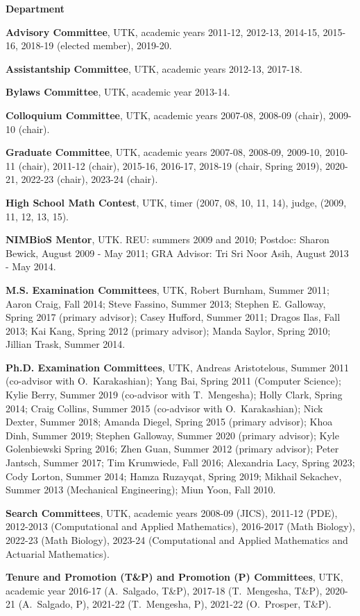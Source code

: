 \documentclass[11pt]{letter}
\begin{document}
\begin{description}
	\item
{\Large\bf Department}
    \begin{description}
    \item
\textbf{Advisory Committee}, UTK, academic years 2011-12, 2012-13, 2014-15, 2015-16, 2018-19 (elected member), 2019-20.
    \item
\textbf{Assistantship Committee}, UTK, academic years 2012-13, 2017-18.
    \item
\textbf{Bylaws Committee}, UTK, academic year 2013-14.
	\item
\textbf{Colloquium Committee}, UTK, academic years 2007-08, 2008-09 (chair), 2009-10 (chair).
    \item
\textbf{Graduate Committee}, UTK, academic years 2007-08, 2008-09, 2009-10, 2010-11 (chair), 2011-12 (chair), 2015-16, 2016-17, 2018-19 (chair, Spring 2019), 2020-21, 2022-23 (chair), 2023-24 (chair).
    \item
\textbf{High School Math Contest}, UTK, timer (2007, 08, 10, 11, 14), judge, (2009, 11, 12, 13, 15).
    \item
\textbf{NIMBioS Mentor}, UTK. REU: summers 2009 and 2010; Postdoc: Sharon Bewick, August 2009 - May 2011; GRA Advisor: Tri Sri Noor Asih, August 2013 - May 2014.
	\item
\textbf{M.S. Examination Committees}, UTK, Robert Burnham, Summer 2011; Aaron Craig, Fall 2014; Steve Fassino, Summer 2013; Stephen E. Galloway, Spring 2017 (primary advisor); Casey Hufford, Summer 2011; Dragos Ilas, Fall 2013; Kai Kang, Spring 2012 (primary advisor); Manda Saylor, Spring 2010; Jillian Trask, Summer 2014.
	\item
\textbf{Ph.D. Examination Committees}, UTK, Andreas Aristotelous, Summer 2011 (co-advisor with O.~Karakashian); Yang Bai, Spring 2011 (Computer Science); Kylie Berry, Summer 2019 (co-advisor with T.~Mengesha); Holly Clark,  Spring 2014; Craig Collins, Summer 2015 (co-advisor with O.~Karakashian); Nick Dexter, Summer 2018; Amanda Diegel, Spring 2015 (primary advisor); Khoa Dinh, Summer 2019; Stephen Galloway, Summer 2020 (primary advisor); Kyle Golenbiewski Spring 2016; Zhen Guan, Summer 2012 (primary advisor); Peter Jantsch, Summer 2017; Tim Krumwiede, Fall 2016; Alexandria Lacy, Spring 2023; Cody Lorton, Summer 2014; Hamza Ruzayqat, Spring 2019; Mikhail Sekachev, Summer 2013 (Mechanical Engineering); Miun Yoon, Fall 2010.
	\item
\textbf{Search Committees}, UTK, academic years 2008-09 (JICS), 2011-12 (PDE), 2012-2013 (Computational and Applied Mathematics), 2016-2017 (Math Biology), 2022-23 (Math Biology), 2023-24  (Computational and Applied Mathematics and Actuarial Mathematics).
	\item
\textbf{Tenure and Promotion (T\&P) and Promotion (P) Committees}, UTK, academic year 2016-17 (A.~Salgado, T\&P), 2017-18 (T.~Mengesha, T\&P), 2020-21 (A.~Salgado, P), 2021-22 (T.~Mengesha, P), 2021-22 (O.~Prosper, T\&P).


\end{description}
\end{description}
\end{document}
